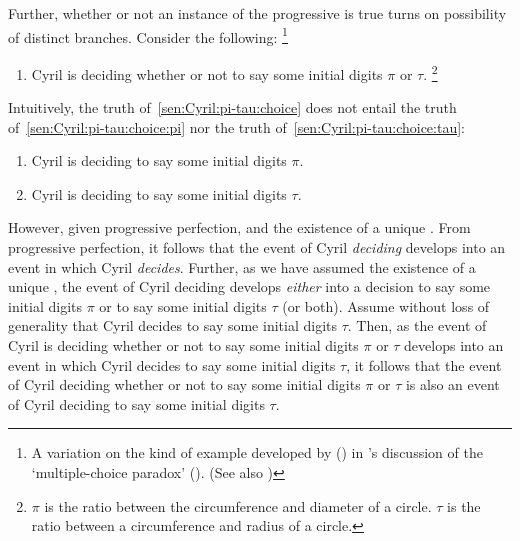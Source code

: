 \begin{note}
  Further, whether or not an instance of the progressive is true turns on possibility of distinct branches.
  Consider the following:%
  \footnote{
    A variation on the kind of example developed by \citeauthor{Bonomi:1997uq} (\citeyear{Bonomi:1997uq}) in \citeauthor{Bonomi:1997uq}'s discussion of the `multiple-choice paradox' (\citeyear[\S4]{Bonomi:1997uq}).
    (See also \cite[37]{Szabo:2004ul})
  }
  \begin{enumerate}[label=\arabic*., ref=(\arabic*), resume*=CyrilProg]
  \item
    \label{sen:Cyril:pi-tau:choice}
    Cyril is deciding whether or not to say some initial digits \(\pi\) or \(\tau\).%
    \footnote{
      \(\pi\) is the ratio between the circumference and diameter of a circle.
      \(\tau\) is the ratio between a circumference and radius of a circle.
    }
  \end{enumerate}
  Intuitively, the truth of~\ref{sen:Cyril:pi-tau:choice} does not entail the truth of~\ref{sen:Cyril:pi-tau:choice:pi} nor the truth of~\ref{sen:Cyril:pi-tau:choice:tau}:

  \begin{enumerate}[label=\arabic*., ref=(\arabic*), resume*=CyrilProg]
  \item
    \label{sen:Cyril:pi-tau:choice:pi}
    Cyril is deciding to say some initial digits \(\pi\).
  \item
    \label{sen:Cyril:pi-tau:choice:tau}
    Cyril is deciding to say some initial digits \(\tau\).
  \end{enumerate}

  However, given progressive perfection, and the existence of a unique .
  From progressive perfection, it follows that the event of Cyril \emph{deciding} develops into an event in which Cyril \emph{decides}.
  Further, as we have assumed the existence of a unique , the event of Cyril deciding develops \emph{either} into a decision to say some initial digits \(\pi\) or to say some initial digits \(\tau\) (or both).
  Assume without loss of generality that Cyril decides to say some initial digits \(\tau\).
  Then, as the event of Cyril is deciding whether or not to say some initial digits \(\pi\) or \(\tau\) develops into an event in which Cyril decides to say some initial digits \(\tau\), it follows that the event of Cyril deciding whether or not to say some initial digits \(\pi\) or \(\tau\) is also an event of Cyril deciding to say some initial digits \(\tau\).


\end{note}
